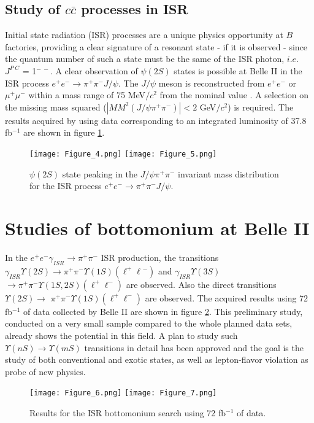 \documentclass[border=2mm]{article}
\begin{document}
\subsection{Study of $c\bar{c}$ processes in ISR}
Initial state radiation (ISR) processes are a unique physics opportunity at $B$ factories, providing a clear signature of a resonant state - if it is observed - since the quantum number of such a state must be the same of the ISR photon, $i.e.$ $J^{P~C}$ = 1$^{-~-}$. A clear observation of $\psi(2S)$ states is possible at Belle II in the ISR process  $e^+ e^- \rightarrow \pi^{+} \pi^{-} J/\psi$. The $J/\psi$ meson is reconstructed from $e^{+}e^{-}$ or $\mu^{+} \mu^{-}$ within a mass range of 75 MeV$/c^2$ from the nominal value \cite{ref:pdgjpsi}.
A selection on the missing mass squared ($|MM^{2}(J/\psi \pi^{+} \pi^{-})| < 2$ GeV$/c^2$) is required. The results acquired by using data corresponding to an integrated luminosity of  37.8 fb$^{-1}$ are shown in figure \ref{fig:ccisr}.
\begin{figure}[H]
  \centering
  \texttt{[image: Figure\_4.png]}
  \texttt{[image: Figure\_5.png]}
  \caption{$\psi(2S)$ state peaking in the $J/\psi \pi^{+} \pi^{-}$ invariant mass distribution for the ISR process  $e^+ e^- \rightarrow \pi^{+} \pi^{-} J/\psi$.}
  \label{fig:ccisr}
\end{figure}

\section{Studies of bottomonium at Belle II}
In the $e^{+}e^{-} \gamma_{ISR} \to \pi^{+} \pi^{-}$ ISR production, the transitions $\gamma_{ISR} \Upsilon(2S) \to \pi^{+} \pi^{-} \Upsilon(1S)(\ell^{+}\ell{^-})$ and
$\gamma_{ISR} \Upsilon(3S)$ $ \to \pi^{+} \pi^{-} \Upsilon(1S,2S)(\ell^{+}\ell^{-})$ are observed. Also the direct transitions
$\Upsilon(2S) \to$ $\pi^{+} \pi^{-}\Upsilon(1S)(\ell^{+}\ell^{-})$ are observed. The acquired results using 72 fb$^{-1}$ of data collected by Belle II are shown in figure \ref{fig:bbisr}.
This preliminary study, conducted on a very small sample compared to the whole planned data sets, already shows the potential in this field.
A plan to study such $\Upsilon(nS) \to \Upsilon(mS)$ transitions in detail has been approved and the goal is the study of both conventional and exotic states, as well as lepton-flavor violation as probe of new physics.
\begin{figure}[H]
  \centering
  \texttt{[image: Figure\_6.png]}
  \texttt{[image: Figure\_7.png]}
  \caption{Results for the ISR bottomonium search using 72 fb$^{-1}$ of data.}
  \label{fig:bbisr}
\end{figure}
\end{document}
